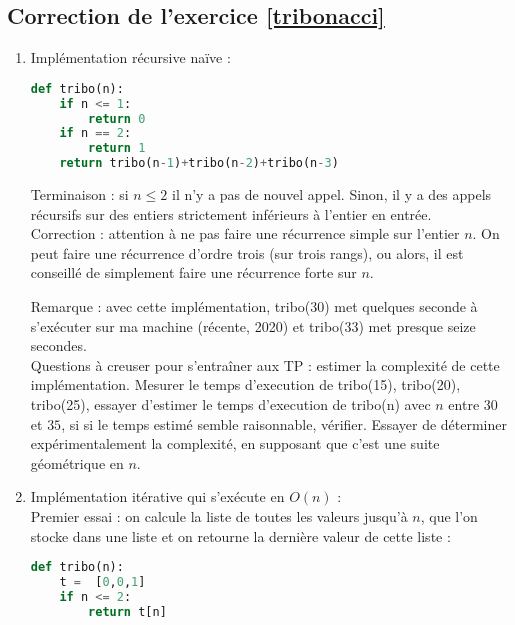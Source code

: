 \documentclass[11pt,a4paper]{article}
\begin{document}
\subsection*{Correction de l'exercice \ref{tribonacci}}
\begin{enumerate}
Remarque : en conditions de TP, les fonctions pourraient être testée et chronométrées avec :
\begin{lstlisting}[language=Python]
def test_tribo():
	assert tribo(3) == 1
	assert tribo(4) == 2
	assert tribo(5) == 4
	assert tribo(9) == 44
	print("Test : tout semble ok")
	
import time
def perf_tribo(n):
	start = time.perf_counter()
	t = tribo(n)
	end = time.perf_counter()
	delta = end - start
	return delta
\end{lstlisting}

\item Implémentation récursive naïve : 
\begin{lstlisting}[language=Python]
def tribo(n):
	if n <= 1:
		return 0
	if n == 2:
		return 1
	return tribo(n-1)+tribo(n-2)+tribo(n-3)
\end{lstlisting}
Terminaison : si $n\leq 2$ il n'y a pas de nouvel appel. Sinon, il y a des appels récursifs sur des entiers strictement inférieurs à l'entier en entrée.\\
Correction : attention à ne pas faire une récurrence simple sur l'entier $n$. On peut faire une récurrence \og d'ordre trois\fg{} (sur trois rangs), ou alors, il est conseillé de simplement faire une récurrence forte sur $n$.

Remarque : avec cette implémentation, tribo(30) met quelques seconde à s'exécuter sur ma machine (récente, 2020) et tribo(33) met presque seize secondes.\\
Questions à creuser pour s'entraîner aux TP : estimer la complexité de cette implémentation. Mesurer le temps d'execution de tribo(15), tribo(20), tribo(25), essayer d'estimer le temps d'execution de tribo(n) avec $n$ entre $30$ et $35$, si si le temps estimé semble raisonnable, vérifier. Essayer de déterminer expérimentalement la complexité, en supposant que c'est une suite géométrique en $n$.
\item Implémentation itérative qui s'exécute en $O(n)$ :\\
Premier essai : on calcule la liste de toutes les valeurs jusqu'à $n$, que l'on stocke dans une liste et on retourne la dernière valeur de cette liste :
\begin{lstlisting}[language=Python]
def tribo(n):
	t =  [0,0,1]
	if n <= 2:
		return t[n]
		

\end{lstlisting}
\end{enumerate}
\end{document}
